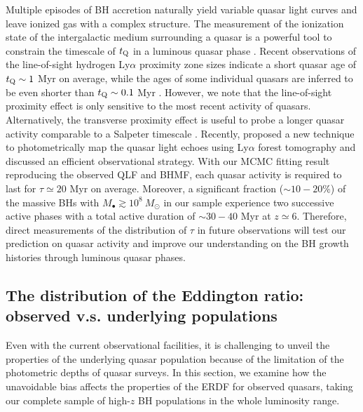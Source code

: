 \documentclass[twocolumn, twocolappendix]{aastex63}
\newcommand{\Msun}{M_\odot}
\begin{document}
\begin{CJK*}{UTF8}{gbsn}
Multiple episodes of BH accretion naturally yield variable quasar light curves and leave ionized gas with a complex structure.
The measurement of the ionization state of the intergalactic medium surrounding a quasar is
a powerful tool to constrain the timescale of $t_{\rm Q}$ in a luminous quasar phase
\citep{2007MNRAS.374..493B,2016ApJ...824..133K,2017ApJ...840...24E,2019ApJ...884L..19D}.
Recent observations of the line-of-sight hydrogen Ly$\alpha$ proximity zone sizes indicate
a short quasar age of $t_{\rm Q} \sim 1$ Myr on average, while the ages of some individual quasars are
inferred to be even shorter than $t_{\rm Q} \sim 0.1$ Myr \citep[e.g.,][]{2020ApJ...903...60I,2021ApJ...917...38E}.
However, we note that the line-of-sight proximity effect is only sensitive to the most recent activity of quasars.
Alternatively, the transverse proximity effect is useful to probe a longer quasar activity comparable to a Salpeter timescale \citep{2004ApJ...612..706A,2008ApJ...674..660V,2019ApJ...882..165S}.
Recently, \citet{2022MNRAS.516..582K} proposed a new technique to photometrically map the quasar light echoes using Ly$\alpha$ forest tomography
and discussed an efficient observational strategy.
With our MCMC fitting result reproducing the observed QLF and BHMF, each quasar activity is required to last for $\tau \simeq 20$ Myr on average.
Moreover, a significant fraction ($\sim 10-20\%$) of the massive BHs with $M_\bullet \gtrsim 10^8~\Msun$ in our sample experience
two successive active phases with a total active duration of $\sim 30-40$ Myr at $z\simeq 6$.
Therefore, direct measurements of the distribution of $\tau$ in future observations will test our prediction on quasar activity and
improve our understanding on the BH growth histories through luminous quasar phases.



\vspace{2mm}
\subsection{The distribution of the Eddington ratio: \\observed v.s. underlying populations}\label{sec:ldist}

Even with the current observational facilities, it is challenging to unveil the properties of the underlying quasar population
because of the limitation of the photometric depths of quasar surveys.
In this section, we examine how the unavoidable bias affects the properties of the ERDF for observed quasars,
taking our complete sample of high-$z$ BH populations in the whole luminosity range.


\end{CJK*}
\end{document}
